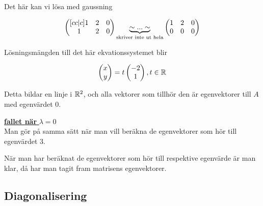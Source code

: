 \documentclass[../main.tex]{subfiles}
\begin{document}
Det här kan vi lösa med gaussning

$$
\begin{pmatrix}[cc|c]
    1 & 2 & 0\\
    1 & 2 & 0\\
\end{pmatrix} \underbrace{\sim ... \sim}_{\text{skriver inte ut hela}}
\begin{pmatrix}
    1 & 2 & 0\\
    0 & 0 & 0
\end{pmatrix}
$$

Lösningsmängden till det här ekvationssystemet blir 

$$
\begin{pmatrix}x\\y\end{pmatrix} = t\begin{pmatrix}-2\\1\end{pmatrix}, t\in\mathbb{R}^{}
$$

Detta bildar en linje i $\mathbb{R}^{2}$, och alla vektorer som tillhör den är egenvektorer till $A$ med egenvärdet 0.


\underline{\textbf{fallet när }$\lambda = 0$}\\

Man gör på samma sätt när man vill beräkna de egenvektorer som hör till egenvärdet 3. 

När man har beräknat de egenvektorer som hör till respektive egenvärde är man klar, då har man tagit fram matrisens egenvektorer. 

\subsection{Diagonalisering}
\end{document}
